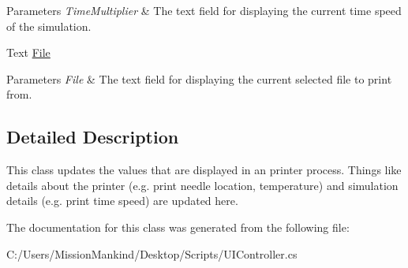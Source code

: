 \begin{DoxyCompactItemize}
\begin{DoxyCompactList}\small\item\em 
\begin{DoxyParams}{Parameters}
{\em Time\+Multiplier} & The text field for displaying the current time speed of the simulation.\\
\hline
\end{DoxyParams}
\end{DoxyCompactList}\item 
\mbox{\label{class_u_i_controller_a30bd00985e2665fc0f4cda1a41df4ea4}} 
Text \hyperlink{class_u_i_controller_a30bd00985e2665fc0f4cda1a41df4ea4}{File}
\begin{DoxyCompactList}\small\item\em 
\begin{DoxyParams}{Parameters}
{\em File} & The text field for displaying the current selected file to print from.\\
\hline
\end{DoxyParams}
\end{DoxyCompactList}\end{DoxyCompactItemize}


\subsection{Detailed Description}
This class updates the values that are displayed in an printer process. Things like details about the printer (e.\+g. print needle location, temperature) and simulation details (e.\+g. print time speed) are updated here. 



The documentation for this class was generated from the following file\+:\begin{DoxyCompactItemize}
\item 
C\+:/\+Users/\+Mission\+Mankind/\+Desktop/\+Scripts/U\+I\+Controller.\+cs\end{DoxyCompactItemize}
